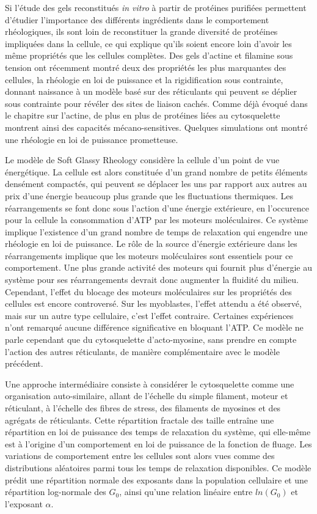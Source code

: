 \documentclass{report}
\begin{document}
Si l'étude des gels reconstitués \textit{in vitro} à partir de protéines purifiées permettent d'étudier l'importance des différents ingrédients dans le comportement rhéologiques, ils sont loin de reconstituer la grande diversité de protéines impliquées dans la cellule, ce qui explique qu'ils soient encore loin d'avoir les même propriétés que les cellules complètes. 
Des gels d'actine et filamine sous tension ont récemment montré deux des propriétés les plus marquantes des cellules, la rhéologie en loi de puissance et la rigidification sous contrainte, donnant naissance à un modèle basé sur des réticulants qui peuvent se déplier sous contrainte pour révéler des sites de liaison cachés. Comme déjà évoqué dans le chapitre sur l'actine, de plus en plus de protéines liées au cytosquelette montrent ainsi des capacités mécano-sensitives. Quelques simulations ont montré une rhéologie en loi de puissance prometteuse. 

Le modèle de Soft Glassy Rheology considère la cellule d'un point de vue énergétique. 
La cellule est alors constituée d'un grand nombre de petits éléments densément compactés, qui peuvent se déplacer les uns par rapport aux autres au prix d'une énergie beaucoup plus grande que les fluctuations thermiques. 
Les réarrangements se font donc sous l'action d'une énergie extérieure, en l'occurence pour la cellule la consommation d'ATP par les moteurs moléculaires. 
Ce système implique l'existence d'un grand nombre de temps de relaxation qui engendre une rhéologie en loi de puissance. 
Le rôle de la source d'énergie extérieure dans les réarrangements implique que les moteurs moléculaires sont essentiels pour ce comportement. Une plus grande activité des moteurs qui fournit plus d'énergie au système pour ses réarrangements devrait donc augmenter la fluidité du milieu. 
Cependant, l'effet du blocage des moteurs moléculaires sur les propriétés des cellules est encore controversé. Sur les myoblastes, l'effet attendu a été observé, mais sur un autre type cellulaire, c'est l'effet contraire. Certaines expériences n'ont remarqué aucune différence significative en bloquant l'ATP. 
Ce modèle ne parle cependant que du cytosquelette d'acto-myosine, sans prendre en compte l'action des autres réticulants, de manière complémentaire avec le modèle précédent. 

Une approche intermédiaire consiste à considérer le cytosquelette comme une organisation auto-similaire, allant de l'échelle du simple filament, moteur et réticulant, à l'échelle des fibres de stress, des filaments de myosines et des agrégats de réticulants. 
Cette répartition fractale des taille entraîne une répartition en loi de puissance des temps de relaxation du système, qui elle-même est à l'origine d'un comportement en loi de puissance de la fonction de fluage. Les variations de comportement entre les cellules sont alors vues comme des distributions aléatoires parmi tous les temps de relaxation disponibles. Ce modèle prédit une répartition normale des exposants dans la population cellulaire et une répartition log-normale des $G_0$, ainsi qu'une relation linéaire entre $ln(G_0)$ et l'exposant $\alpha$. 
\end{document}
